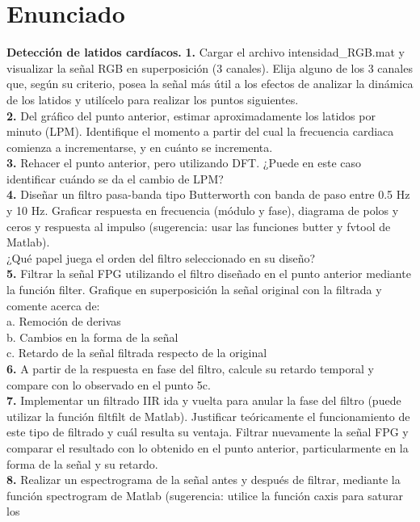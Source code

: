 \section{Enunciado}
\label{sec:enun}
\textbf{Detección de latidos cardíacos.}
\textbf{1.} Cargar el archivo intensidad_RGB.mat y visualizar la señal RGB en
superposición (3 canales). Elija alguno de los 3 canales que, según su criterio, posea
la señal más útil a los efectos de analizar la dinámica de los latidos y utilícelo para
realizar los puntos siguientes.\\
\textbf{2.} Del gráfico del punto anterior, estimar aproximadamente los latidos por minuto
(LPM). Identifique el momento a partir del cual la frecuencia cardiaca comienza a
incrementarse, y en cuánto se incrementa.\\
\textbf{3.} Rehacer el punto anterior, pero utilizando DFT. ¿Puede en este caso identificar
cuándo se da el cambio de LPM?\\
\textbf{4.} Diseñar un filtro pasa-banda tipo Butterworth con banda de paso entre 0.5 Hz y 10
Hz. Graficar respuesta en frecuencia (módulo y fase), diagrama de polos y ceros y
respuesta al impulso (sugerencia: usar las funciones butter y fvtool de Matlab).\\
¿Qué papel juega el orden del filtro seleccionado en su diseño?\\
\textbf{5.} Filtrar la señal FPG utilizando el filtro diseñado en el punto anterior mediante la
función filter. Grafique en superposición la señal original con la filtrada y
comente acerca de:\\
a. Remoción de derivas\\
b. Cambios en la forma de la señal\\
c. Retardo de la señal filtrada respecto de la original\\
\textbf{6.} A partir de la respuesta en fase del filtro, calcule su retardo temporal y compare con
lo observado en el punto 5c.\\
\textbf{7.} Implementar un filtrado IIR ida y vuelta para anular la fase del filtro (puede utilizar
la función filtfilt de Matlab). Justificar teóricamente el funcionamiento de este
tipo de filtrado y cuál resulta su ventaja. Filtrar nuevamente la señal FPG y comparar
el resultado con lo obtenido en el punto anterior, particularmente en la forma de la
señal y su retardo.\\
\textbf{8.} Realizar un espectrograma de la señal antes y después de filtrar, mediante la función
spectrogram de Matlab (sugerencia: utilice la función caxis para saturar los
